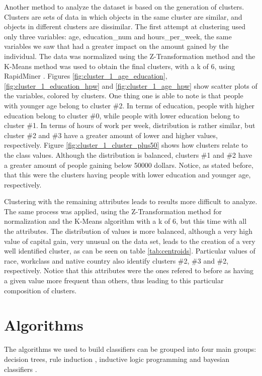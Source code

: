\documentclass[a4paper]{llncs}
\begin{document}
Another method to analyze the dataset is based on the generation of clusters. 
Clusters are sets of data in which objects in the same cluster are similar, and
objects in different clusters are dissimilar. The first attempt at clustering
used only three variables: age, education\_num and hours\_per\_week, the same
variables we saw that had a greater impact on the amount gained by the
individual. The data was normalized using the Z-Transformation method and the 
K-Means method was used to obtain the final clusters, with a k of 6, using RapidMiner \cite{4}. Figures 
\ref{fig:cluster_1_age_education}, \ref{fig:cluster_1_education_hpw} and \ref{fig:cluster_1_age_hpw} show
scatter plots of the variables, colored by clusters. One thing one is able to
note is that people with younger age belong to cluster \#2. In terms of
education, people with higher education belong to cluster \#0, while people with
lower education belong to cluster \#1. In terms of hours of work per week, 
distribution is rather similar, but cluster \#2 and \#3 have a greater amount of
lower and higher values, respectively. Figure \ref{fig:cluster_1_cluster_plus50}
shows how clusters relate to the class values. Although the distribution is 
balanced, clusters \#1 and \#2 have a greater amount of people gaining below 
50000 dollars. Notice, as stated before, that this were the clusters having 
people with lower education and younger age, respectively.

Clustering with the remaining attributes leads to results more difficult to
analyze. The same process was applied, using the Z-Transformation method for
normalization and the K-Means algorithm with a k of 6, but this time with all
the attributes. The distribution of values is more balanced, although a very
high value of capital gain, very unusual on the data set, leads to the creation
of a very well identified cluster, as can be seen on table \ref{tab:centroids}.
Particular values of race, workclass and native country also identify clusters
\#2, \#3 and \#2, respectively. Notice that this attributes were the ones
refered to before as having a given value more frequent than others, thus
leading to this particular composition of clusters.

\section{Algorithms} \label{sec:algs}

The algorithms we used to build classifiers can be grouped into four main
groups: decision trees, rule induction \cite{rule_induction},
inductive logic programming and bayesian classifiers \cite{bayes}.
\end{document}
